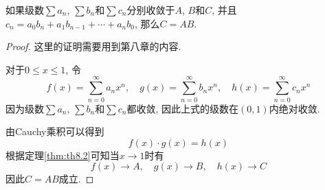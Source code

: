 \documentclass[cn,12pt,math=mtpro2,citestyle=gb7714-2015,bibstyle=gb7714-2015,twocol]{elegantbook}
\begin{document}
\begin{theorem}[Abel定理]
  如果级数$\sum a_n$, $\sum b_n$和$\sum c_n$分别收敛于$A$, $B$和$C$, 并且$c_n=a_0b_n+a_1b_{n-1}+\cdots+a_nb_0$, 那么$C=AB$.
\end{theorem}
\begin{proof}
  这里的证明需要用到第八章的内容.

  对于$0\leq x\leq 1$, 令
  $$f(x)=\sum_{n=0}^{\infty}a_nx^n,\quad g(x)=\sum_{n=0}^{\infty}b_nx^n,\quad h(x)=\sum_{n=0}^{\infty}c_nx^n$$
  因为级数$\sum a_n$, $\sum b_n$和$\sum c_n$都收敛, 因此上式的级数在$(0,1)$内绝对收敛.

  由Cauchy乘积可以得到
  $$f(x)\cdot g(x)=h(x)$$
  根据定理\ref{thm:th8.2}可知当$x\to1$时有
  $$f(x)\to A,\quad g(x)\to B,\quad h(x)\to C$$
  因此$C=AB$成立.

\end{proof}
\end{document}
